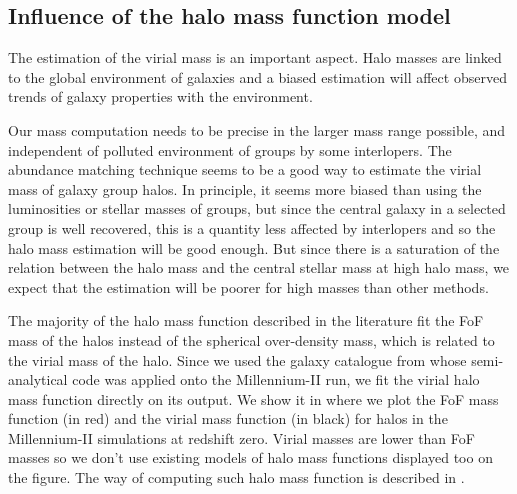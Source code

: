 \subsection{Influence of the halo mass function model}
\label{sub:hmf_test}

The estimation of the virial mass is an important aspect. Halo masses are
linked to the global environment of galaxies and a biased estimation will
affect observed trends of galaxy properties with the environment.

Our mass computation needs to be precise in the larger mass range possible, and
independent of polluted environment of groups by some interlopers. The
abundance matching technique seems to be a good way to estimate the virial mass
of galaxy group halos. In principle, it seems more biased than using the
luminosities or stellar masses of groups, but since the central galaxy in a
selected group is well recovered, this is a quantity less affected by
interlopers and so the halo mass estimation will be good enough. But since
there is a saturation of the relation between the halo mass and the central
stellar mass at high halo mass, we expect that the estimation will be poorer
for high masses than other methods.

The majority of the halo mass function described in the literature fit the FoF
mass of the halos instead of the spherical over-density mass, which is related
to the virial mass of the halo. Since we used the galaxy catalogue from
\citet{Guo+11} whose semi-analytical code was applied onto the Millennium-II
run, we fit the virial halo mass function directly on its output. We show it in
 where we plot the FoF mass function (in red) and the virial
mass function (in black) for halos in the Millennium-II simulations at redshift
zero. Virial masses are lower than FoF masses so we don't use existing models
of halo mass functions displayed too on the figure. The way of computing such
halo mass function is described in .


